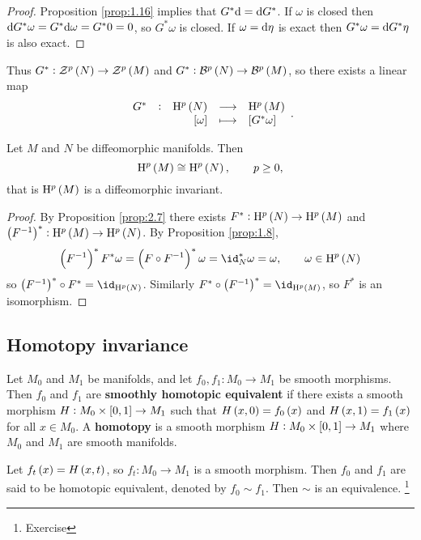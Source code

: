 \begin{proof}
Proposition \ref{prop:1.16} implies that $ G^*\mathrm{d} = \mathrm{d} G^* $. If $ \omega $ is closed then $ \mathrm{d} G^*\omega = G^*\mathrm{d}\omega = G^*0 = 0 $, so $ G^*\omega $ is closed. If $ \omega = \mathrm{d}\eta $ is exact then $ G^*\omega = \mathrm{d} G^*\eta $ is also exact.
\end{proof}

Thus $ G^* : \ZZZ^p\br{N} \to \ZZZ^p\br{M} $ and $ G^* : \BBB^p\br{N} \to \BBB^p\br{M} $, so there exists a linear map
$$ \function[G^*]{\H^p\br{N}}{\H^p\br{M}}{\sbr{\omega}}{\sbr{G^*\omega}}. $$

\begin{corollary}
Let $ M $ and $ N $ be diffeomorphic manifolds. Then
$$ \H^p\br{M} \cong \H^p\br{N}, \qquad p \ge 0, $$
that is $ \H^p\br{M} $ is a diffeomorphic invariant.
\end{corollary}

\begin{proof}
By Proposition \ref{prop:2.7} there exists $ F^* : \H^p\br{N} \to \H^p\br{M} $ and $ \br{F^{-1}}^* : \H^p\br{M} \to \H^p\br{N} $. By Proposition \ref{prop:1.8},
$$ \br{F^{-1}}^*F^*\omega = \br{F \circ F^{-1}}^*\omega = \id_N^*\omega = \omega, \qquad \omega \in \H^p\br{N} $$
so $ \br{F^{-1}}^* \circ F^* = \id_{\H^p\br{N}} $. Similarly $ F^* \circ \br{F^{-1}}^* = \id_{\H^p\br{M}} $, so $ F^* $ is an isomorphism.
\end{proof}

\subsection{Homotopy invariance}

\begin{definition}
Let $ M_0 $ and $ M_1 $ be manifolds, and let $ f_0, f_1 : M_0 \to M_1 $ be smooth morphisms. Then $ f_0 $ and $ f_1 $ are \textbf{smoothly homotopic equivalent} if there exists a smooth morphism $ H : M_0 \times \sbr{0, 1} \to M_1 $ such that $ H\br{x, 0} = f_0\br{x} $ and $ H\br{x, 1} = f_1\br{x} $ for all $ x \in M_0 $. A \textbf{homotopy} is a smooth morphism $ H : M_0 \times \sbr{0, 1} \to M_1 $ where $ M_0 $ and $ M_1 $ are smooth manifolds.
\end{definition}


\begin{notation}
Let $ f_t\br{x} = H\br{x, t} $, so $ f_t : M_0 \to M_1 $ is a smooth morphism. Then $ f_0 $ and $ f_1 $ are said to be homotopic equivalent, denoted by $ f_0 \sim f_1 $. Then $ \sim $ is an equivalence. \footnote{Exercise}
\end{notation}

